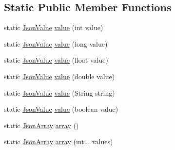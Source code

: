 \subsection*{Static Public Member Functions}
\begin{DoxyCompactItemize}
\item 
static \hyperlink{classcom_1_1ingeniigroup_1_1stratux_1_1_tools_1_1_json_micro_1_1_json_value}{Json\+Value} \hyperlink{classcom_1_1ingeniigroup_1_1stratux_1_1_tools_1_1_json_micro_1_1_json_aa7a17dbf2bbb667284cb5a86d404bf6d}{value} (int value)
\item 
static \hyperlink{classcom_1_1ingeniigroup_1_1stratux_1_1_tools_1_1_json_micro_1_1_json_value}{Json\+Value} \hyperlink{classcom_1_1ingeniigroup_1_1stratux_1_1_tools_1_1_json_micro_1_1_json_af2c5388580e7dc541af4a3ca8e1a86f2}{value} (long value)
\item 
static \hyperlink{classcom_1_1ingeniigroup_1_1stratux_1_1_tools_1_1_json_micro_1_1_json_value}{Json\+Value} \hyperlink{classcom_1_1ingeniigroup_1_1stratux_1_1_tools_1_1_json_micro_1_1_json_af7f208fc087bc3e4fa605da2c7aa28fd}{value} (float value)
\item 
static \hyperlink{classcom_1_1ingeniigroup_1_1stratux_1_1_tools_1_1_json_micro_1_1_json_value}{Json\+Value} \hyperlink{classcom_1_1ingeniigroup_1_1stratux_1_1_tools_1_1_json_micro_1_1_json_a7029915af0f1d495bdb9b9c0fc1eacd0}{value} (double value)
\item 
static \hyperlink{classcom_1_1ingeniigroup_1_1stratux_1_1_tools_1_1_json_micro_1_1_json_value}{Json\+Value} \hyperlink{classcom_1_1ingeniigroup_1_1stratux_1_1_tools_1_1_json_micro_1_1_json_a2ee871c2b766953b3c7db577e352fe93}{value} (String string)
\item 
static \hyperlink{classcom_1_1ingeniigroup_1_1stratux_1_1_tools_1_1_json_micro_1_1_json_value}{Json\+Value} \hyperlink{classcom_1_1ingeniigroup_1_1stratux_1_1_tools_1_1_json_micro_1_1_json_a5733b6d96202d8f2e25b8c1dc43522b2}{value} (boolean value)
\item 
static \hyperlink{classcom_1_1ingeniigroup_1_1stratux_1_1_tools_1_1_json_micro_1_1_json_array}{Json\+Array} \hyperlink{classcom_1_1ingeniigroup_1_1stratux_1_1_tools_1_1_json_micro_1_1_json_a5eb11ae96fc3a678d555537c65a6e323}{array} ()
\item 
static \hyperlink{classcom_1_1ingeniigroup_1_1stratux_1_1_tools_1_1_json_micro_1_1_json_array}{Json\+Array} \hyperlink{classcom_1_1ingeniigroup_1_1stratux_1_1_tools_1_1_json_micro_1_1_json_ad60b39f91e1c6acc0bd4c865c81c1b1a}{array} (int... values)

\end{DoxyCompactItemize}
